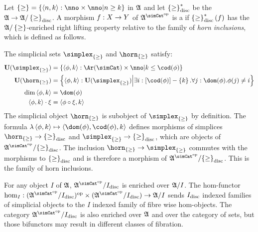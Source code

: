 \documentclass[csh.tex]{subfiles}
\begin{document}
\begin{definition}
Let $\set\geq = \set{\tuplet{n,k}\of \nno\times\nno |n\geq k}$ in $\mathfrak A$ and let $\left\{\geq\right\}_{\rm disc}^*$ be the  $\mathfrak A\to\mathfrak A/\left\{\geq\right\}_{\rm disc}$.
A morphism $f: X\to Y$ of $\ambient\s$ is a  if $\left\{\geq\right\}_{\rm disc}^*(f)$ has the $\mathfrak A/\left\{\geq\right\}$-enriched right lifting property relative to the family of \emph{horn inclusions}, which is defined as follows.

The simplicial sets $\simplex_{\set\geq}$ and $\horn_{\set\geq}$ satisfy:
\begin{align*}
\base(\simplex_{\set\geq}) &= \set{\tuplet{\phi,k}\of\Ar(\simCat)\times\nno\middle| k\leq \cod(\phi) } \\
\base(\horn_{\set\geq}) &= \set{\tuplet{\phi,k}\of\base(\simplex_{\set\geq})\middle| 
\exists i\of[\cod(\phi)]-\set k.\forall j\of \dom(\phi).\phi(j)\neq i} \\
\dim\tuplet{\phi,k} &= \dom(\phi) \\
\tuplet{\phi,k}\cdot \xi &= \tuplet{\phi\circ\xi,k}
\end{align*}
The simplicial object $\horn_{\set\geq}$ is subobject of $\simplex_{\set\geq}$ by definition. 
The formula $\function{\tuplet{\phi,k}}\tuplet{\dom(\phi),\cod(\phi),k}$ defines morphisms of simplices $\horn_{\set\geq}\to {\set\geq}\disc$ and $\simplex_{\set\geq}\to {\set\geq}\disc$, which are objects of $\ambient\s/{\set\geq}\disc$. The inclusion $\horn_{\set\geq}\to\simplex_{\set\geq}$ commutes with the morphisms to ${\left\{\geq\right\}}_{\rm disc}$ and is therefore a morphism of $\ambient\s/{\set\geq}\disc$. This is the family of horn inclusions.

\end{definition}

\begin{remark}\label{fibred enrichment}
For any object $I$ of $\mathfrak A$, $\ambient\s/I\disc$ is enriched over $\mathfrak A/I$. The hom-functor $\hom_I\of(\ambient\s/I\disc)\dual\times(\ambient\s/I\disc)\to\ambient/I$ sends $I_{\rm disc}$ indexed families of simplicial objects to the $I$ indexed family of fibre wise hom-objects. The category $\ambient\s/I\disc$ is also enriched over $\mathfrak A$ and over the category of sets, but those bifunctors may result in different classes of fibration. 
\end{remark}
\end{document}
